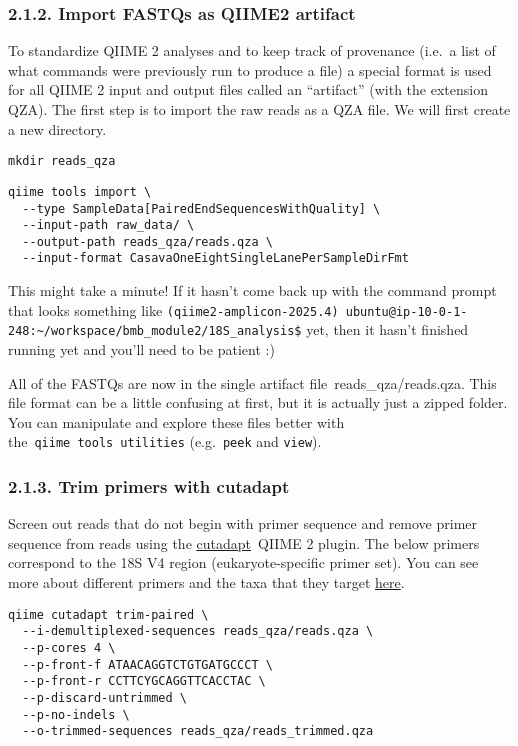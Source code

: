 \documentclass[
]{book}
\begin{document}
\subsubsection{2.1.2. Import FASTQs as QIIME2 artifact}\label{import-fastqs-as-qiime2-artifact-1}

To standardize QIIME 2 analyses and to keep track of provenance (i.e.~a list of what commands were previously run to produce a file) a special format is used for all QIIME 2 input and output files called an ``artifact'' (with the extension QZA). The first step is to import the raw reads as a QZA file. We will first create a new directory.

\begin{verbatim}
mkdir reads_qza
\end{verbatim}

\begin{verbatim}
qiime tools import \
  --type SampleData[PairedEndSequencesWithQuality] \
  --input-path raw_data/ \
  --output-path reads_qza/reads.qza \
  --input-format CasavaOneEightSingleLanePerSampleDirFmt
\end{verbatim}

This might take a minute! If it hasn't come back up with the command prompt that looks something like \texttt{(qiime2-amplicon-2025.4)\ ubuntu@ip-10-0-1-248:\textasciitilde{}/workspace/bmb\_module2/18S\_analysis\$} yet, then it hasn't finished running yet and you'll need to be patient :)

All of the FASTQs are now in the single artifact file~reads\_qza/reads.qza. This file format can be a little confusing at first, but it is actually just a zipped folder. You can manipulate and explore these files better with the~\texttt{qiime\ tools\ utilities} (e.g.~\texttt{peek} and \texttt{view}).

\subsubsection{2.1.3. Trim primers with cutadapt}\label{trim-primers-with-cutadapt-1}

Screen out reads that do not begin with primer sequence and remove primer sequence from reads using the \href{http://cutadapt.readthedocs.io/en/stable/guide.html}{cutadapt}~QIIME 2 plugin. The below primers correspond to the 18S V4 region (eukaryote-specific primer set). You can see more about different primers and the taxa that they target \href{https://imr.bio/protocols.html}{here}.

\begin{verbatim}
qiime cutadapt trim-paired \
  --i-demultiplexed-sequences reads_qza/reads.qza \
  --p-cores 4 \
  --p-front-f ATAACAGGTCTGTGATGCCCT \
  --p-front-r CCTTCYGCAGGTTCACCTAC \
  --p-discard-untrimmed \
  --p-no-indels \
  --o-trimmed-sequences reads_qza/reads_trimmed.qza
\end{verbatim}
\end{document}
